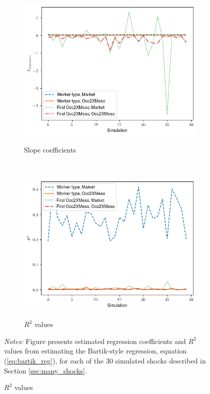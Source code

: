 \documentclass[12pt]{article}
\theoremstyle{definition}
\theoremstyle{plain}
\begin{document}
\begin{figure}[htbp]
	\centering
	\caption{Exposure coefficients from all simulated shocks}
	\begin{subfigure}{\textwidth}
		\centering
		\caption{Slope coefficients}
		\includegraphics[width=.7\textwidth]{../Results/reduced_form/3states_2009to2011_fake_data_all_sector_shocks_coef.png} %
		\label{fig:fake_data_all_sector_shocks_coef}
	\end{subfigure}\\
 	\vfill
 	\vspace{1em}
	\begin{subfigure}{\textwidth}
		\centering
		\caption{$R^2$ values}
		\includegraphics[width=.7\textwidth]{../Results/reduced_form/3states_2009to2011_fake_data_all_sector_shocks_r2.png} %
		\label{fig:fake_data_all_sector_shocks_r2}
	\end{subfigure}
	\label{fig:fake_data_all_sector_shocks}
	\footnotesize\flushleft \emph{Notes:} Figure presents estimated regression coefficients and $R^2$ values from estimating the Bartik-style regression, equation (\ref{eq:bartik_reg}), for each of the 30 simulated shocks described in Section \ref{sec:many_shocks}.  
\end{figure}
\end{document}
